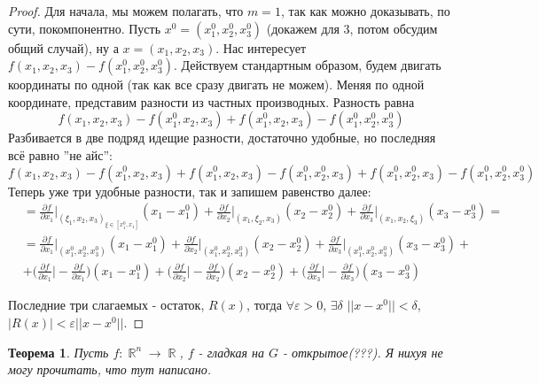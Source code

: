 \documentclass[a4paper,100pt]{article}
\theoremstyle{indented}
\newtheorem{theorem}{Теорема}
\theoremstyle{definition}
\theoremstyle{remark}
\DeclareMathOperator{\RR}{\mathbb{R}}
\begin{document}
\begin{proof}
    Для начала, мы можем полагать, что $m=1$, так как можно доказывать, по сути, покомпонентно. Пусть $x^0=(x_1^0, x_2^0, x_3^0)$ (докажем для 3, потом обсудим общий случай), ну а $x=(x_1, x_2, x_3)$. Нас интересует $f(x_1, x_2, x_3)-f(x_1^0, x_2^0, x_3^0)$. Действуем стандартным образом, будем двигать координаты по одной (так как все сразу двигать не можем). Меняя по одной координате, представим разности из частных производных. Разность равна 
    \[
        f(x_1, x_2, x_3)-f(x_1^0, x_2, x_3)+f(x_1^0, x_2, x_3)-f(x_1^0, x_2^0, x_3^0)
    \]
    Разбивается в две подряд идещие разности, достаточно удобные, но последняя всё равно ''не айс'':
    \[
        f(x_1, x_2, x_3)-f(x_1^0, x_2, x_3)+f(x_1^0, x_2, x_3)-f(x_1^0, x_2^0, x_3)+f(x_1^0, x_2^0, x_3)-f(x_1^0, x_2^0, x_3^0)
    \]
    Теперь уже три удобные разности, так и запишем равенство далее:
    \begin{equation*}
        \begin{aligned}
            &= \frac{\partial f}{\partial x_1}\bigg|_{(\xi_1, x_2, x_3)_{\xi\in [x_1^0, x_1]}}(x_1-x_1^0)+\frac{\partial f}{\partial x_2}\bigg|_{(x_1, \xi_2, x_3)}(x_2-x_2^0)+\frac{\partial f}{\partial x_3}\bigg|_{(x_1, x_2, \xi_3)}(x_3-x_3^0) = \\
            &= \frac{\partial f}{\partial x_1}\bigg|_{(x_1^0, x_2^0, x_3^0)}(x_1-x_1^0)+\frac{\partial f}{\partial x_2}\bigg|_{(x_1^0, x_2^0, x_3^0)}(x_2-x_2^0)+\frac{\partial f}{\partial x_3}\bigg|_{(x_1^0, x_2^0, x_3^0)}(x_3-x_3^0) + \\
            &+ \biggl(\frac{\partial f}{\partial x_1}\bigg| - \frac{\partial f}{\partial x_1}\biggr)(x_1-x_1^0)+\biggl(\frac{\partial f}{\partial x_2}\bigg| - \frac{\partial f}{\partial x_2}\biggr)(x_2-x_2^0)+\biggl(\frac{\partial f}{\partial x_3}\bigg| - \frac{\partial f}{\partial x_3}\biggr)(x_3-x_3^0)
        \end{aligned}
    \end{equation*}

    Последние три слагаемых - остаток, $R(x)$, тогда  $\forall \varepsilon >0$, $\exists \delta$ $||x-x^0||<\delta$, $|R(x)|<\varepsilon ||x-x^0||$. 


\end{proof}

\begin{theorem}
    Пусть $f:\RR^n\rightarrow \RR$, $f$ - гладкая на $G$ - открытое(???). Я нихуя не могу прочитать, что тут написано.
\end{theorem}
\end{document}
